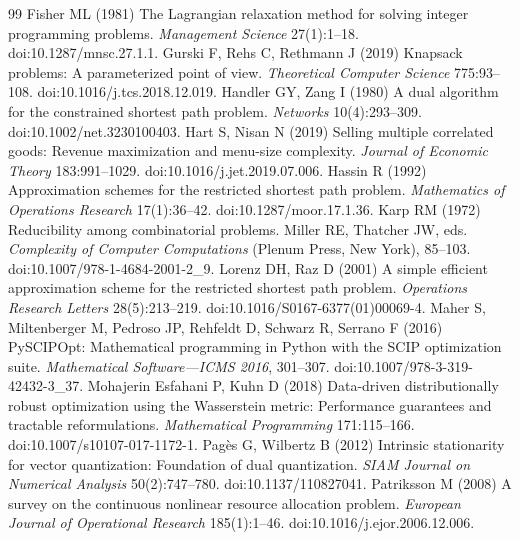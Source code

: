 \documentclass[11pt,letterpaper]{article}
\theoremstyle{definition}\newtheorem{remark}[theorem]{Remark}
\begin{document}
\begin{thebibliography}{99}
Fisher ML (1981) The Lagrangian relaxation method for solving integer programming problems. \emph{Management Science} 27(1):1--18. doi:10.1287/mnsc.27.1.1.
Gurski F, Rehs C, Rethmann J (2019) Knapsack problems: A parameterized point of view. \emph{Theoretical Computer Science} 775:93--108. doi:10.1016/j.tcs.2018.12.019.
Handler GY, Zang I (1980) A dual algorithm for the constrained shortest path problem. \emph{Networks} 10(4):293--309. doi:10.1002/net.3230100403.
Hart S, Nisan N (2019) Selling multiple correlated goods: Revenue maximization and menu-size complexity. \emph{Journal of Economic Theory} 183:991--1029. doi:10.1016/j.jet.2019.07.006.
Hassin R (1992) Approximation schemes for the restricted shortest path problem. \emph{Mathematics of Operations Research} 17(1):36--42. doi:10.1287/moor.17.1.36.
Karp RM (1972) Reducibility among combinatorial problems. Miller RE, Thatcher JW, eds. \emph{Complexity of Computer Computations} (Plenum Press, New York), 85--103. doi:10.1007/978-1-4684-2001-2\_9.
Lorenz DH, Raz D (2001) A simple efficient approximation scheme for the restricted shortest path problem. \emph{Operations Research Letters} 28(5):213--219. doi:10.1016/S0167-6377(01)00069-4.
Maher S, Miltenberger M, Pedroso JP, Rehfeldt D, Schwarz R, Serrano F (2016) PySCIPOpt: Mathematical programming in Python with the SCIP optimization suite. \emph{Mathematical Software---ICMS 2016}, 301--307. doi:10.1007/978-3-319-42432-3\_37.
Mohajerin Esfahani P, Kuhn D (2018) Data-driven distributionally robust optimization using the Wasserstein metric: Performance guarantees and tractable reformulations. \emph{Mathematical Programming} 171:115--166. doi:10.1007/s10107-017-1172-1.
Pag\`es G, Wilbertz B (2012) Intrinsic stationarity for vector quantization: Foundation of dual quantization. \emph{SIAM Journal on Numerical Analysis} 50(2):747--780. doi:10.1137/110827041.
Patriksson M (2008) A survey on the continuous nonlinear resource allocation problem. \emph{European Journal of Operational Research} 185(1):1--46. doi:10.1016/j.ejor.2006.12.006.

\end{thebibliography}
\end{document}
